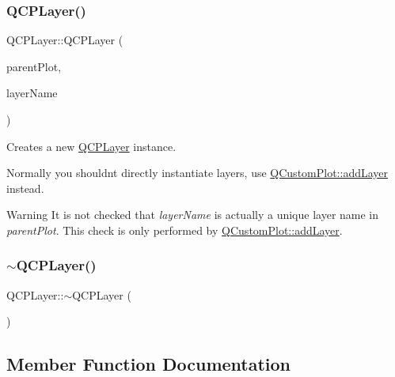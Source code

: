 \subsubsection{\texorpdfstring{QCPLayer()}{QCPLayer()}}
{\footnotesize\ttfamily Q\+C\+P\+Layer\+::\+Q\+C\+P\+Layer (\begin{DoxyParamCaption}\item[{\mbox{\hyperlink{class_q_custom_plot}{Q\+Custom\+Plot}} $\ast$}]{parent\+Plot,  }\item[{const Q\+String \&}]{layer\+Name }\end{DoxyParamCaption})}

Creates a new \mbox{\hyperlink{class_q_c_p_layer}{Q\+C\+P\+Layer}} instance.

Normally you shouldn\textquotesingle{}t directly instantiate layers, use \mbox{\hyperlink{class_q_custom_plot_ad5255393df078448bb6ac83fa5db5f52}{Q\+Custom\+Plot\+::add\+Layer}} instead.

\begin{DoxyWarning}{Warning}
It is not checked that {\itshape layer\+Name} is actually a unique layer name in {\itshape parent\+Plot}. This check is only performed by \mbox{\hyperlink{class_q_custom_plot_ad5255393df078448bb6ac83fa5db5f52}{Q\+Custom\+Plot\+::add\+Layer}}. 
\end{DoxyWarning}
\mbox{\label{class_q_c_p_layer_afc1a8940f8e34c9f25ead9dfd4828cae}} 
\subsubsection{\texorpdfstring{$\sim$QCPLayer()}{~QCPLayer()}}
{\footnotesize\ttfamily Q\+C\+P\+Layer\+::$\sim$\+Q\+C\+P\+Layer (\begin{DoxyParamCaption}{ }\end{DoxyParamCaption})\hspace{0.3cm}{\ttfamily [virtual]}}



\subsection{Member Function Documentation}
\mbox{\label{class_q_c_p_layer_a57ce5e49364aa9122276d5df3b4a0ddc}} 

